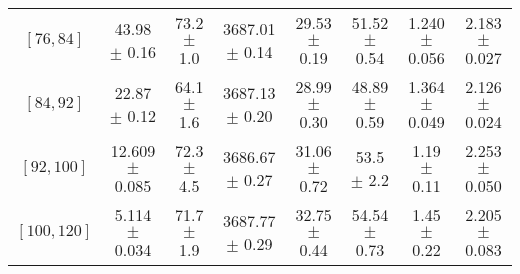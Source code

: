 \begin{tabular}{c||c|c|c|c|c|c|c}
$[76, 84]$ & 43.98 $\pm$ 0.16 & 73.2 $\pm$ 1.0 & 3687.01 $\pm$ 0.14 & 29.53 $\pm$ 0.19 & 51.52 $\pm$ 0.54 & 1.240 $\pm$ 0.056 & 2.183 $\pm$ 0.027\\
$[84, 92]$ & 22.87 $\pm$ 0.12 & 64.1 $\pm$ 1.6 & 3687.13 $\pm$ 0.20 & 28.99 $\pm$ 0.30 & 48.89 $\pm$ 0.59 & 1.364 $\pm$ 0.049 & 2.126 $\pm$ 0.024\\
$[92, 100]$ & 12.609 $\pm$ 0.085 & 72.3 $\pm$ 4.5 & 3686.67 $\pm$ 0.27 & 31.06 $\pm$ 0.72 & 53.5 $\pm$ 2.2 & 1.19 $\pm$ 0.11 & 2.253 $\pm$ 0.050\\
$[100, 120]$ & 5.114 $\pm$ 0.034 & 71.7 $\pm$ 1.9 & 3687.77 $\pm$ 0.29 & 32.75 $\pm$ 0.44 & 54.54 $\pm$ 0.73 & 1.45 $\pm$ 0.22 & 2.205 $\pm$ 0.083\\
\end{tabular}
